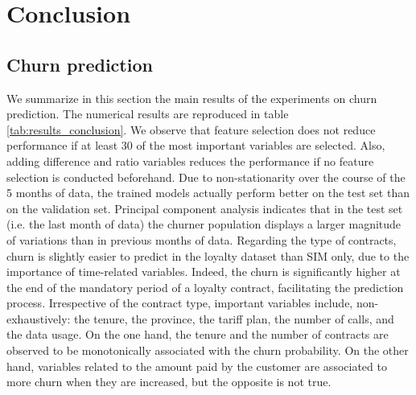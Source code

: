 \chapter{Conclusion}

\section{Churn prediction}

We summarize in this section the main results of the experiments on churn
prediction. The numerical results are reproduced in table
\ref{tab:results_conclusion}. We observe that feature selection does not reduce
performance if at least 30 of the most important variables are selected. Also,
adding difference and ratio variables reduces the performance if no feature
selection is conducted beforehand. Due to non-stationarity over the course of
the 5 months of data, the trained models actually perform better on the test set
than on the validation set. Principal component analysis indicates that in the
test set (i.e. the last month of data) the churner population displays a larger
magnitude of variations than in previous months of data. Regarding the type of
contracts, churn is slightly easier to predict in the loyalty dataset than SIM
only, due to the importance of time-related variables. Indeed, the churn is
significantly higher at the end of the mandatory period of a loyalty contract,
facilitating the prediction process. Irrespective of the contract type,
important variables include, non-exhaustively: the tenure, the province, the
tariff plan, the number of calls, and the data usage. On the one hand, the
tenure and the number of contracts are observed to be monotonically associated with
the churn probability. On the other hand, variables related to the amount paid
by the customer are associated to more churn when they are increased, but the
opposite is not true.

